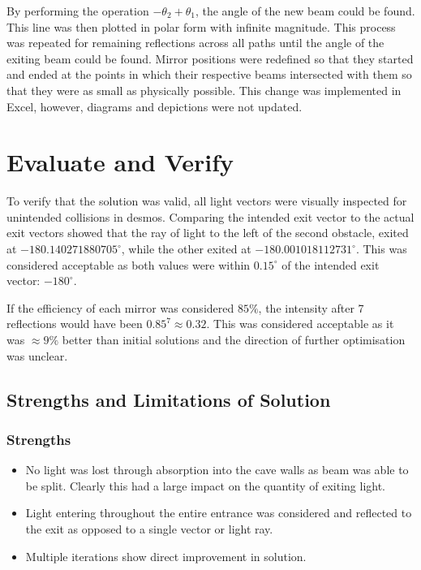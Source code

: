 \documentclass[11pt, letterpaper]{article}
\begin{document}
By performing the operation $- \theta_2 + \theta_1 $, the angle of the new beam could be found. This line was then plotted in polar form with infinite magnitude.
This process was repeated for remaining reflections across all paths until the angle of the exiting beam could be found. Mirror positions were redefined so that they started and ended at the points in which their respective beams intersected with them so that they were as small as physically possible. This change was implemented in Excel, however, diagrams and depictions were not updated.




\section{Evaluate and Verify}

To verify that the solution was valid, all light vectors were visually inspected for unintended collisions in desmos. Comparing the intended exit vector to the actual exit vectors showed that the ray of light to the left of the second obstacle, exited at $-180.140271880705^{\circ}$, while the other exited at $-180.001018112731	^\circ$. This was considered acceptable as both values were within $0.15^\circ$ of the intended exit vector: $-180^\circ$.

If the efficiency of each mirror was considered $85\%$, the intensity after 7 reflections would have been $0.85^7 \approx 0.32$. This was considered acceptable as it was $\approx 9\%$ better than initial solutions and the direction of further optimisation was unclear.


\subsection{Strengths and Limitations of Solution}
\subsubsection{Strengths}
\begin{itemize}
\item No light was lost through absorption into the cave walls as beam was able to be split. Clearly this had a large impact on the quantity of exiting light.
\item Light entering throughout the entire entrance was considered and reflected to the exit as opposed to a single vector or light ray.

\item Multiple iterations show direct improvement in solution.

\end{itemize}
\end{document}
